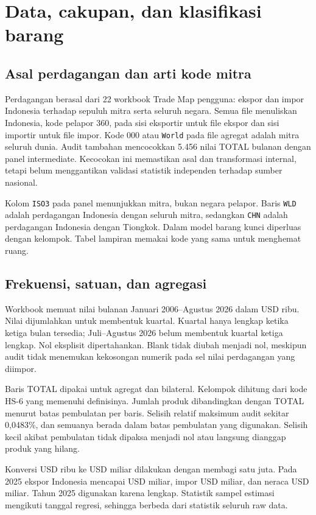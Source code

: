 \section{Data, cakupan, dan klasifikasi barang}\label{sec:data}
\subsection{Asal perdagangan dan arti kode mitra}
Perdagangan berasal dari 22 workbook Trade Map pengguna: ekspor dan impor Indonesia terhadap sepuluh mitra serta seluruh negara. Semua file menuliskan Indonesia, kode pelapor 360, pada sisi eksportir untuk file ekspor dan sisi importir untuk file impor. Kode 000 atau \texttt{World} pada file agregat adalah mitra seluruh dunia. Audit tambahan mencocokkan 5.456 nilai TOTAL bulanan dengan panel intermediate. Kecocokan ini memastikan asal dan transformasi internal, tetapi belum menggantikan validasi statistik independen terhadap sumber nasional.

Kolom \texttt{ISO3} pada panel menunjukkan mitra, bukan negara pelapor. Baris \texttt{WLD} adalah perdagangan Indonesia dengan seluruh mitra, sedangkan \texttt{CHN} adalah perdagangan Indonesia dengan Tiongkok. Dalam model barang kunci diperluas dengan kelompok. Tabel lampiran memakai kode yang sama untuk menghemat ruang.

\subsection{Frekuensi, satuan, dan agregasi}
Workbook memuat nilai bulanan Januari 2006--Agustus 2026 dalam USD ribu. Nilai dijumlahkan untuk membentuk kuartal. Kuartal hanya lengkap ketika ketiga bulan tersedia; Juli--Agustus 2026 belum membentuk kuartal ketiga lengkap. Nol eksplisit dipertahankan. Blank tidak diubah menjadi nol, meskipun audit tidak menemukan kekosongan numerik pada sel nilai perdagangan yang diimpor.

Baris TOTAL dipakai untuk agregat dan bilateral. Kelompok dihitung dari kode HS-6 yang memenuhi definisinya. Jumlah produk dibandingkan dengan TOTAL menurut batas pembulatan per baris. Selisih relatif maksimum audit sekitar 0,0483\%, dan semuanya berada dalam batas pembulatan yang digunakan. Selisih kecil akibat pembulatan tidak dipaksa menjadi nol atau langsung dianggap produk yang hilang.

Konversi USD ribu ke USD miliar dilakukan dengan membagi satu juta. Pada 2025 ekspor Indonesia mencapai USD \WorldExports{} miliar, impor USD \WorldImports{} miliar, dan neraca USD \WorldNet{} miliar. Tahun 2025 digunakan karena lengkap. Statistik sampel estimasi mengikuti tanggal regresi, sehingga berbeda dari statistik seluruh raw data.

